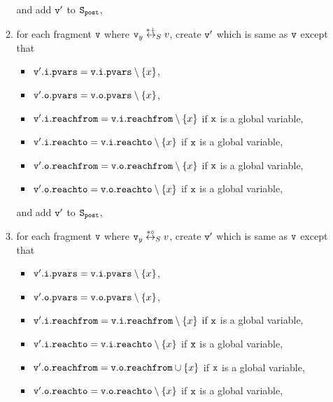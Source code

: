 \begin{itemize}
\begin{enumerate}
\begin{itemize}
\end{itemize}
and add $\tt v'$ to $\tt S_{post}$,
\item for each fragment $\tt v$ where $\mathtt{v}_y \overset{*+}\leftrightarrow_S v$, create $\tt v'$ which is same as $\tt v$ except that
\begin{itemize}
\item $\mathtt{v}'.\mathtt{i}.\mathtt{pvars} = \mathtt{v}.\mathtt{i}.\mathtt{pvars} \setminus \left\{x\right\}$,
\item $\mathtt{v}'.\mathtt{o}.\mathtt{pvars} = \mathtt{v}.\mathtt{o}.\mathtt{pvars} \setminus \left\{x\right\}$,
\item $\mathtt{v}'.\mathtt{i}.\mathtt{reachfrom} = \mathtt{v}.\mathtt{i}.\mathtt{reachfrom} \setminus \left\{x\right\}$ if $\tt x$ is a global variable,
\item $\mathtt{v}'.\mathtt{i}.\mathtt{reachto} = \mathtt{v}.\mathtt{i}.\mathtt{reachto} \setminus \left\{x\right\}$ if $\tt x$ is a global variable,
\item $\mathtt{v}'.\mathtt{o}.\mathtt{reachfrom} = \mathtt{v}.\mathtt{o}.\mathtt{reachfrom} \setminus \left\{x\right\}$ if $\tt x$ is a global variable,
\item $\mathtt{v}'.\mathtt{o}.\mathtt{reachto} = \mathtt{v}.\mathtt{o}.\mathtt{reachto} \setminus \left\{x\right\}$ if $\tt x$ is a global variable,
\end{itemize}
and add $\tt v'$ to $\tt S_{post}$,
\item for each fragment $\tt v$ where $\mathtt{v}_y \overset{*\circ}\leftrightarrow_S v$, create $\tt v'$ which is same as $\tt v$ except that
\begin{itemize}
\item $\mathtt{v}'.\mathtt{i}.\mathtt{pvars} = \mathtt{v}.\mathtt{i}.\mathtt{pvars} \setminus \left\{x\right\}$,
\item $\mathtt{v}'.\mathtt{o}.\mathtt{pvars} = \mathtt{v}.\mathtt{o}.\mathtt{pvars} \setminus \left\{x\right\}$,
\item $\mathtt{v}'.\mathtt{i}.\mathtt{reachfrom} = \mathtt{v}.\mathtt{i}.\mathtt{reachfrom} \setminus \left\{x\right\}$ if $\tt x$ is a global variable,
\item $\mathtt{v}'.\mathtt{i}.\mathtt{reachto} = \mathtt{v}.\mathtt{i}.\mathtt{reachto} \setminus \left\{x\right\}$ if $\tt x$ is a global variable,
\item $\mathtt{v}'.\mathtt{o}.\mathtt{reachfrom} = \mathtt{v}.\mathtt{o}.\mathtt{reachfrom} \cup \left\{x\right\}$ if $\tt x$ is a global variable,
\item $\mathtt{v}'.\mathtt{o}.\mathtt{reachto} = \mathtt{v}.\mathtt{o}.\mathtt{reachto} \setminus \left\{x\right\}$ if $\tt x$ is a global variable,


\end{itemize}
\end{enumerate}
\end{itemize}
